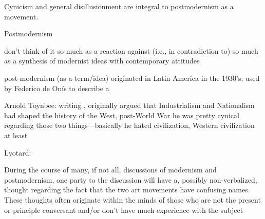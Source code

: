 \documentclass[../butidigress.tex]{subfiles}
\newcounter{worldwarcounter}\setcounter{worldwarcounter}{1}
\begin{document}
\setcounter{worldwarcounter}{2}

Cynicism and general disillusionment are integral to postmodernism as a movement.


\begin{somenotes}{Postmodernism}
    \item don't think of it so much as a reaction against (i.e., in contradiction to) so much as a synthesis of modernist ideas with contemporary attitudes
    \item post-modernism (as a term/idea) originated in Latin America in the 1930's; used by Federico de Onís to describe a \autocite[4]{originspostmodernity}
    \item Arnold Toynbee: writing , originally argued that Industrialism and Nationalism had shaped the history of the West, post-World War  he was pretty cynical regarding those two things---basically he hated civilization, Western civilization at least
    \item Lyotard: \autocite{postmodernsep}
\end{somenotes}

During the course of many, if not all, discussions of modernism and postmodernism, one party to the discussion will have a, possibly non-verbalized, thought regarding the fact that the two art movements have confusing names.
These thoughts often originate within the minds of those who are not the present or principle conversant and/or don't have much experience with the subject


\end{document}
